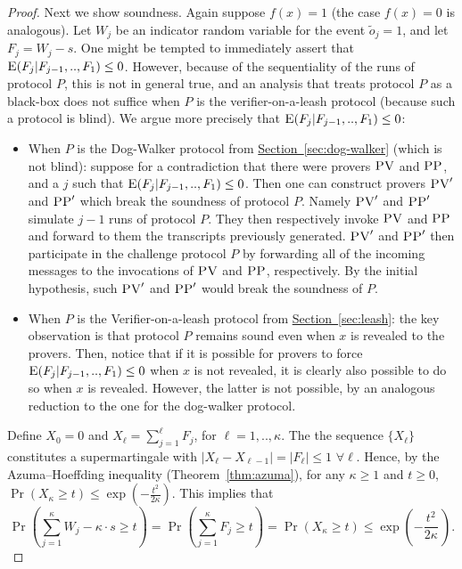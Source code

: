 \documentclass[11pt]{article}
\numberwithin{equation}{section}
\theoremstyle{definition}
\theoremstyle{plain}
\newcommand{\expref}[2]{\hyperref[#2]{#1~\ref{#2}}}
\newcommand{\pv}{\textsc{PV}}
\newcommand{\pp}{\textsc{PP}}
\begin{document}
\begin{proof}
Next we show soundness.
Again suppose $f(x) = 1$ (the case $f(x) = 0$ is analogous). Let $W_j$ be an indicator random variable for the event $\tilde{o}_j = 1$, and let $F_j = W_j - s$. One might be tempted to immediately assert that $\textsc{E}(F_j|F_{j-1},..,F_1) \leq 0$. However, because of the sequentiality of the runs of protocol $P$, this is not in general true, and an analysis that treats protocol $P$ as a black-box does not suffice when $P$ is the verifier-on-a-leash protocol (because such a protocol is blind). We argue more precisely that $\textsc{E}(F_j|F_{j-1},..,F_1) \leq 0$:
\begin{itemize}
    \item When $P$ is the Dog-Walker protocol from \expref{Section}{sec:dog-walker} (which is not blind): suppose for a contradiction that there were provers $\pv$ and $\pp$, and a $j$ such that $\textsc{E}(F_j|F_{j-1},..,F_1) \leq 0$. Then one can construct provers $\pv'$ and $\pp'$ which break the soundness of protocol $P$. Namely $\pv'$ and $\pp'$ simulate $j-1$ runs of protocol $P$. They then respectively invoke $\pv$ and $\pp$ and forward to them the transcripts previously generated. $\pv'$ and $\pp'$ then participate in the challenge protocol $P$ by forwarding all of the incoming messages to the invocations of $\pv$ and $\pp$, respectively. %
By the initial hypothesis, such $\pv'$ and $\pp'$ would break the soundness of $P$.
    \item When $P$ is the Verifier-on-a-leash protocol from \expref{Section}{sec:leash}: the key observation is that protocol $P$ remains sound even when $x$ is revealed to the provers. Then, notice that if it is possible for provers to force $\textsc{E}(F_j|F_{j-1},..,F_1) \leq 0$ when $x$ is not revealed, it is clearly also possible to do so when $x$ is revealed. However, the latter is not possible, by an analogous reduction to the one for the dog-walker protocol. 
\end{itemize}
Define $X_0=0$ and $X_\ell = \sum_{j=1}^\ell F_j$, for $\ell=1,..,\kappa$. The
%
the sequence $\{X_\ell\}$ constitutes   %
a supermartingale with $|X_\ell-X_{\ell-1}| = |F_\ell| \leq 1 \,\, \forall \ell$.  Hence,%
by the Azuma--Hoeffding inequality   %
(Theorem~\ref{thm:azuma}),
%
for any $\kappa\geq 1$ and $t\geq 0$, $\Pr(X_\kappa \geq t) \leq \exp(-\frac{t^2}{2\kappa})$. This implies that 
\begin{equation*}
\Pr \left(\sum_{j=1}^{\kappa} W_j - \kappa \cdot s \geq t \right) = \Pr \left(\sum_{j=1}^{\kappa}F_j \geq t \right) = \Pr \left(X_{\kappa} \geq t \right) \leq \exp\left(-\frac{t^2}{2\kappa}\, \right).

\end{equation*}
\end{proof}
\end{document}
